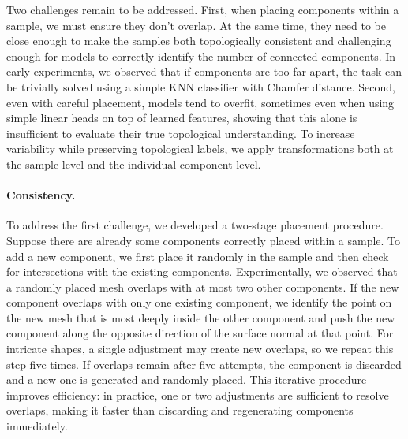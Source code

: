 Two challenges remain to be addressed. First, when placing components within a sample, we must ensure they don't overlap. At the same time, they need to be close enough to make the samples both topologically consistent and challenging enough for models to correctly identify the number of connected components. In early experiments, we observed that if components are too far apart, the task can be trivially solved using a simple KNN classifier with Chamfer distance. Second, even with careful placement, models tend to overfit, sometimes even when using simple linear heads on top of learned features, showing that this alone is insufficient to evaluate their true topological understanding. To increase variability while preserving topological labels, we apply transformations both at the sample level and the individual component level.

\paragraph{Consistency.} 
To address the first challenge, we developed a two-stage placement procedure. Suppose there are already some components correctly placed within a sample. To add a new component, we first place it randomly in the sample and then check for intersections with the existing components. Experimentally, we observed that a randomly placed mesh overlaps with at most two other components. If the new component overlaps with only one existing component, we identify the point on the new mesh that is most deeply inside the other component and push the new component along the opposite direction of the surface normal at that point. For intricate shapes, a single adjustment may create new overlaps, so we repeat this step five times. If overlaps remain after five attempts, the component is discarded and a new one is generated and randomly placed. This iterative procedure improves efficiency: in practice, one or two adjustments are sufficient to resolve overlaps, making it faster than discarding and regenerating components immediately.

